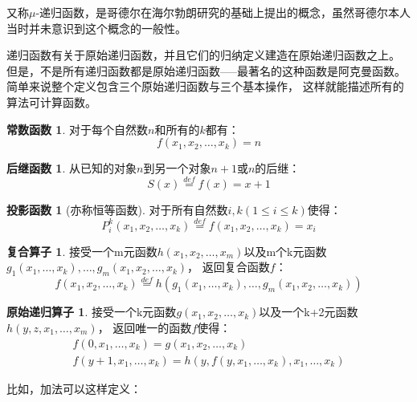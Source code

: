 \documentclass[12pt,a4paper]{ctexrep}
\theoremstyle{definition}
\newtheorem{con}[rf]{常数函数}
\newtheorem{suc}[rf]{后继函数}
\newtheorem{pro}[rf]{投影函数}
\newtheorem{com}[rf]{复合算子}
\newtheorem{pri}[rf]{原始递归算子}
\begin{document}
又称$\mu$-递归函数，是哥德尔在海尔勃朗研究的基础上提出的概念，虽然哥德尔本人
当时并未意识到这个概念的一般性。

递归函数有关于原始递归函数，并且它们的归纳定义建造在原始递归函数之上。
但是，不是所有递归函数都是原始递归函数-----最著名的这种函数是阿克曼函数。
简单来说整个定义包含三个原始递归函数与三个基本操作，
这样就能描述所有的算法可计算函数。

\begin{con}
对于每个自然数$n$和所有的$k$都有：
\begin{equation}
f(x_1,x_2,\ldots,x_k)=n
\end{equation}
\end{con}

\begin{suc}
从已知的对象$n$到另一个对象$n+1$或$n$的后继：
\begin{equation}
S(x)\stackrel{def}{=}f(x)=x+1
\end{equation}
\end{suc}

\begin{pro}[亦称恒等函数]
对于所有自然数$i,k(1\leq i \leq k)$使得：
\begin{equation}
P^k_i(x_1,x_2,\ldots,x_k) \stackrel{def}{=}f(x_1,x_2,\ldots,x_k)=x_i
\end{equation}
\end{pro}

\begin{com}
接受一个m元函数$h(x_1,x_2,\ldots,x_m)$以及m个k元函数$g_1(x_1,\ldots,x_k),\ldots,g_m(x_1,x_2,\ldots,x_k)$，
返回复合函数$f$：
\begin{equation}
f(x_1,x_2,\ldots,x_k) \stackrel{def}{=}h(g_1(x_1,\ldots,x_k),\ldots,g_m(x_1,x_2,\ldots,x_k))
\end{equation}
\end{com}

\begin{pri}
接受一个k元函数$g(x_1,x_2,\ldots,x_k)$以及一个k+2元函数$h(y,z,x_1,\ldots,x_m)$，
返回唯一的函数$f$使得：
\begin{equation}
\begin{split}
f(0,x_1,\ldots,x_k) = g(x_1,x_2,\ldots,x_k)\\
f(y+1,x_1,\ldots,x_k) = h(y,f(y,x_1,\ldots,x_k),x_1,\ldots,x_k)
\end{split}
\end{equation}
\end{pri}

比如，加法可以这样定义：
\end{document}
